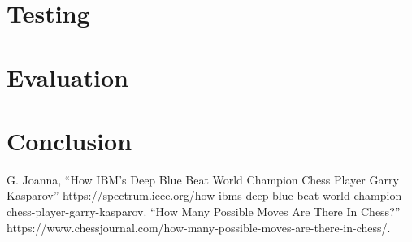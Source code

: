 \documentclass[conference]{IEEEtran}
\begin{document}
\section{Testing}
\vspace{10pt}

\section{Evaluation}
\vspace{10pt}

\section{Conclusion}
\vspace{10pt}

\begin{thebibliography}{00}
 G. Joanna, ``How IBM’s Deep Blue Beat World Champion Chess Player Garry Kasparov'' https://spectrum.ieee.org/how-ibms-deep-blue-beat-world-champion-chess-player-garry-kasparov.
 ``How Many Possible Moves Are There In Chess?'' https://www.chessjournal.com/how-many-possible-moves-are-there-in-chess/.
\end{thebibliography}
\vspace{12pt}
\end{document}
